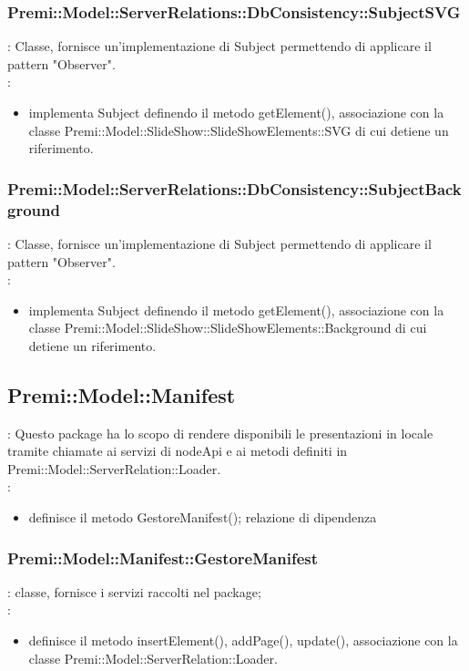{            \subsubsection{Premi::Model::ServerRelations::DbConsistency::SubjectSVG}{
				\textbf{\tipo}: Classe, fornisce un’implementazione di Subject permettendo di applicare il pattern "Observer".\\	
				\textbf{\relaz}: 
				\begin{itemize}
					\item implementa Subject definendo il metodo getElement(), associazione con la classe Premi::Model::SlideShow::SlideShowElements::SVG di cui detiene un riferimento.
				\end{itemize}	
            }
            
             \subsubsection{Premi::Model::ServerRelations::DbConsistency::SubjectBackground}{
				\textbf{\tipo}: Classe, fornisce un’implementazione di Subject permettendo di applicare il pattern "Observer".\\	
				\textbf{\relaz}: 
				\begin{itemize}
					\item implementa Subject definendo il metodo getElement(), associazione con la classe Premi::Model::SlideShow::SlideShowElements::Background di cui detiene un riferimento.
				\end{itemize}	
            }

}


\subsection{Premi::Model::Manifest}{
   	\textbf{\tipo}: Questo package ha lo scopo di rendere disponibili le presentazioni in locale tramite chiamate ai servizi di nodeApi e ai metodi definiti in Premi::Model::ServerRelation::Loader. \\
   	\textbf{\relaz}:
   	\begin{itemize}
   		\item definisce il metodo GestoreManifest(); relazione di dipendenza 
   	\end{itemize}

	\subsubsection{Premi::Model::Manifest::GestoreManifest}{
		\textbf{\tipo}: classe, fornisce i servizi raccolti nel package;\\
		\textbf{\relaz}:
		\begin{itemize}
			\item definisce il metodo insertElement(), addPage(), update(), associazione con la classe Premi::Model::ServerRelation::Loader.
		\end{itemize}
        }
}

